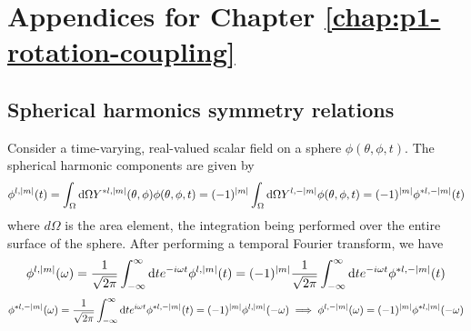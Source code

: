 \chapter{Appendices for Chapter \ref{chap:p1-rotation-coupling}}
\label{chap:apdx-p1}
\section{Spherical harmonics symmetry relations}
\label{apdx:p1-sph-symm}
Consider a time-varying, real-valued scalar field on a sphere
\(\phi(\theta, \phi, t)\). The
spherical harmonic components are given by
\begin{equation}
    \phi^{l,|m|}(t) = \int_\Omega {\mathrm{d}}\Omega Y^{*l, |m|}(\theta, \phi)
    \phi(\theta, \phi, t)
    = (-1)^{|m|} \int_\Omega {\mathrm{d}}\Omega Y^{l, -|m|} \phi(\theta, \phi, t)
    = (-1)^{|m|} \phi^{*l, -|m|}(t)
\end{equation}
where $d\Omega$ is the area element, the integration being performed over
the entire surface of the sphere.
After performing a temporal Fourier transform, we have
\begin{equation}
    \phi^{l,|m|}(\omega) = \frac{1}{\sqrt{2\pi}}\int_{-\infty}^\infty {\mathrm{d}} t
    e^{-i\omega t} \phi^{l, |m|}(t)
    = (-1)^{|m|} \frac{1}{\sqrt{2\pi}}\int_{-\infty}^\infty {\mathrm{d}} t
    e^{-i\omega t} \phi^{* l, -|m|}(t)
\end{equation}
\begin{equation}
\phi^{*l, -|m|}(\omega) = \frac{1}{\sqrt{2\pi}} \int_{-\infty}^\infty {\mathrm{d}} t e^{i\omega t}
\phi^{*l, -|m|}(t) = (-1)^{|m|} \phi^{l, |m|}(-\omega) \implies
\phi^{l, -|m|}(\omega) = (-1)^{|m|} \phi^{*l, |m|}(-\omega)
\end{equation}
